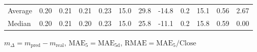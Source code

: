 \begin{threeparttable}
{\begin{tabular}{lrrrrrrrrrrr}
Average &          0.20 &          0.21 &          0.21 &        0.23 &                15.0 &                29.8 &      -14.8 &                 0.2 &             15.1 &            0.56 &                   2.67 \\
 Median &          0.20 &          0.21 &          0.20 &        0.23 &                15.0 &                25.8 &      -11.1 &                 0.2 &             15.8 &            0.59 &                   0.00 \\
\bottomrule
\end{tabular}
}
\begin{tablenotes}\footnotesize
\item $m_\Delta=m_{\text{pred}}-m_{\text{real}}$,
$\mathrm{MAE}_5=\mathrm{MAE}_{5\text{d}}$,
$\mathrm{RMAE}=\mathrm{MAE}_5/\text{Close}$
\end{tablenotes}
\end{threeparttable}
\endgroup

